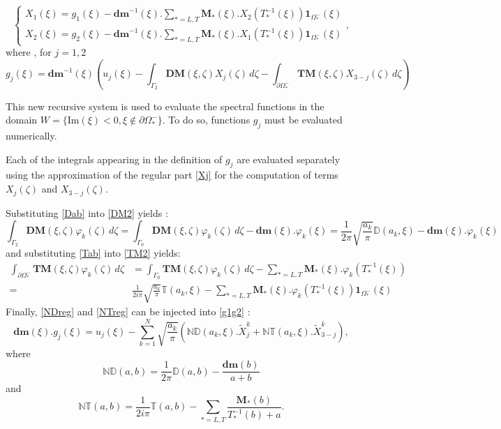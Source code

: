 \begin{equation}
\left\{
\begin{matrix}
X_1(\xi) =g_1(\xi)-\textbf{dm}^{-1}(\xi).\underset{*=L,T}{\sum} \mathbf{M}_*(\xi).X_2(T_*^{-1}(\xi))\textbf{1}_{\Omega_*^-}(\xi) \\
X_2(\xi) =g_2(\xi)-\textbf{dm}^{-1}(\xi).\underset{*=L,T}{\sum} \mathbf{M}_*(\xi).X_1(T_*^{-1}(\xi))\textbf{1}_{\Omega_*^-}(\xi)
\end{matrix}
\right.,
\label{recur}
\end{equation}
where , for $j=1,2$
\begin{equation}
g_j(\xi)=\textbf{dm}^{-1}(\xi)\left( u_j(\xi)- \int_{\Gamma_2}  \textbf{DM}(\xi,\zeta)X_j(\zeta)\, d\zeta- \int_{\partial \Omega_*^-}  \textbf{TM}(\xi,\zeta)X_{3-j}(\zeta)\, d\zeta \right) 
\label{g1g2}
\end{equation}

This new recursive system is used to evaluate the spectral functions in the domain $W=\{ \mbox{Im}(\xi)<0, \xi \notin \partial \Omega_*^- \}$. To do so, functions $g_j$ must be evaluated numerically.

Each of the integrals appearing in the definition of $g_j$ are evaluated separately using the approximation of the regular part \eqref{Xj} for the computation of terms $X_j(\zeta)$ and $X_{3-j}(\zeta)$. 

Substituting \eqref{Dab} into \eqref{DM2} yields :
\begin{equation}
\int_{\Gamma_2}\textbf{DM}(\xi,\zeta)\varphi_k(\zeta) \, d\zeta = \int_{\Gamma_0}\textbf{DM}(\xi,\zeta)\varphi_k(\zeta)\, d\zeta -\textbf{dm}(\xi).\varphi_k(\xi)=\frac{1}{2\pi}\sqrt{\frac{a_k}{\pi}} \mathbb{D}(a_k,\xi)-\textbf{dm}(\xi).\varphi_k(\xi) 
\label{NDreg}
\end{equation}
and substituting \eqref{Tab} into \eqref{TM2} yields:
\begin{equation}
\begin{split}
\int_{\partial \Omega_*^-}  \textbf{TM}(\xi,\zeta)\varphi_k(\zeta)\, d\zeta&=\int_{\Gamma_0} \textbf{TM}(\xi,\zeta)\varphi_k(\zeta)\, d\zeta  -\sum_{*=L,T} \mathbf{M}_*(\xi).\varphi_k(T^{-1}_*(\xi)) \\
= &\frac{1}{2i\pi} \sqrt{\frac{a_k}{\pi}} \mathbb{T}(a_k,\xi)- \sum_{*=L,T}\mathbf{M}_*(\xi).\varphi_k(T^{-1}_*(\xi))\textbf{1}_{\Omega_*^-}(\xi)
\end{split}
\label{NTreg}
\end{equation}
Finally, \eqref{NDreg} and \eqref{NTreg} can be injected into \eqref{g1g2} :
\begin{equation}
\textbf{dm}(\xi).g_j(\xi)=u_j(\xi)-\sum_{k=1}^N \sqrt{\frac{a_k}{\pi}}\left( \mathbb{ND}(a_k,\xi).\tilde{X}_j^k+\mathbb{NT}(a_k,\xi).\tilde{X}_{3-j}^k \right) ,
\label{gjfinal}
\end{equation}
where
\begin{equation}
\mathbb{ND}(a,b)=\frac{1}{2\pi}\mathbb{D}(a,b)-\frac{\textbf{dm}(b)}{a+b}
\label{defND}
\end{equation}
and
\begin{equation}
\mathbb{NT}(a,b)=\frac{1}{2i\pi}\mathbb{T}(a,b)-\sum_{*=L,T}\frac{\mathbf{M}_*(b)}{T^{-1}_*(b)+a} .
\end{equation}

